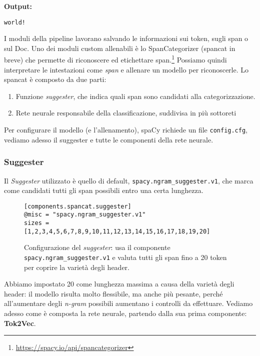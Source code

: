 \noindent \textbf{Output:}

\begin{lstlisting}[style=output]
world!
\end{lstlisting}

\noindent I moduli della pipeline lavorano salvando le informazioni sui token, sugli span o sul Doc. Uno dei moduli custom allenabili è lo SpanCategorizer (spancat in breve) che permette di riconoscere ed etichettare span.\footnote{\url{https://spacy.io/api/spancategorizer}} Possiamo quindi interpretare le intestazioni come \textit{span} e allenare un modello per riconoscerle. Lo spancat è composto da due parti:
\begin{enumerate}
    \item Funzione \textit{suggester}, che indica quali span sono candidati alla categorizzazione.
    \item Rete neurale responsabile della classificazione, suddivisa in più sottoreti
\end{enumerate}

\noindent Per configurare il modello (e l'allenamento), spaCy richiede un file \texttt{config.cfg}, vediamo adesso il suggester e tutte le componenti della rete neurale.
\subsubsection{Suggester}
Il \textit{Suggester} utilizzato è quello di default, \texttt{spacy.ngram\_suggester.v1}, che marca come candidati tutti gli span possibili entro una certa lunghezza.

\begin{figure}[H]
    \centering
    \scriptsize
\begin{lstlisting}[style=cmd]
[components.spancat.suggester]
@misc = "spacy.ngram_suggester.v1"
sizes = [1,2,3,4,5,6,7,8,9,10,11,12,13,14,15,16,17,18,19,20]
\end{lstlisting}
    \caption{Configurazione del \textit{suggester}: usa il componente \texttt{spacy.ngram\_suggester.v1} e valuta tutti gli span fino a 20 token per coprire la varietà degli header.}
    \label{fig:cfg-suggester}
\end{figure}

\noindent Abbiamo impostato 20 come lunghezza massima a causa della varietà degli header: il modello risulta molto flessibile, ma anche più pesante, perché all'aumentare degli \textit{n-gram} possibili aumentano i controlli da effettuare.
Vediamo adesso come è composta la rete neurale, partendo dalla sua prima componente: \textbf{Tok2Vec}.
